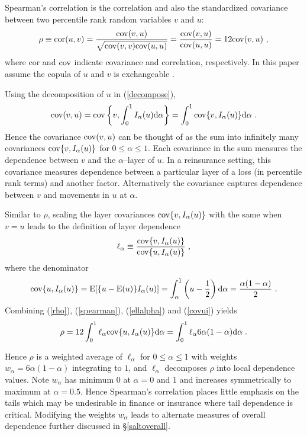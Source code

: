 \documentclass[authoryear]{elsarticle}
\newcommand{\cov}{{\rm cov}}
\newcommand{\E}{{\mathrm E}}
\newcommand{\cor}{\mathrm{cor}}
\newcommand{\de}{\mathrm{d}}
\newcommand{\eref}[1]{(\ref{#1})}
\newcommand{\sref}[1]{\S\ref{#1}}
\begin{document}
Spearman's correlation is the correlation and also the standardized covariance between two percentile rank random variables $v$ and $u$:
\begin{equation}\label{rho}
\rho \equiv \cor(u,v) = \frac{\cov(v,u)}{\sqrt{\cov(v,v)\cov(u,u)}}=\frac{\cov(v,u)}{\cov(u,u)} = 12\cov(v,u)\ ,
\end{equation}
where $\cor$ and $\cov$ indicate covariance and correlation, respectively. In this paper assume the copula of $u$ and $v$ is exchangeable \citep{nelson1999ic}.

Using the decomposition of $u$ in \eref{decompose},
\begin{equation}\label{spearman}
\cov(v,u)=\cov\left\{v,\int_0^1I_\alpha(u)\de \alpha \right\}= \int_0^1 \cov\{v,I_\alpha(u)\} \de \alpha \; .
\end{equation}
Hence the covariance $\cov(v,u)$ can be thought of as the sum  into infinitely many covariances $\cov\{v,I_\alpha(u)\}$ for $0\le\alpha\le 1$. Each covariance in the sum measures the dependence between $v$ and the $\alpha$--layer of $u$. In a reinsurance setting, this covariance measures dependence between a particular layer of a loss (in percentile rank terms) and another factor. Alternatively the covariance captures dependence between $v$ and movements in $u$ at $\alpha$.

 Similar to $\rho$, scaling the layer covariances  $\cov\{v,I_\alpha(u)\}$ with the same when $v=u$ leads to the definition of layer dependence
\begin{equation}\label{ellalpha}
\ell_\alpha \equiv \frac{\cov\{v,I_\alpha(u)\}}{\cov\{u,I_\alpha(u)\}}   \;,
\end{equation}
where the denominator
\begin{equation}\label{covui}
\cov\{u,I_\alpha(u)\}=\E[\{u-\E(u)\}I_\alpha(u)]=\int_\alpha^1 \left(u  - \frac{1}{2}\right)\de \alpha = \frac{\alpha(1-\alpha)}{2}\ .
\end{equation}
Combining \eref{rho}, \eref{spearman}, \eref{ellalpha}  and \eref{covui} yields
\begin{equation}\label{wtdavg}
\rho = 12\int_0^1 \ell_\alpha \cov\{u,I_\alpha(u)\} \de \alpha =  \int_0^1 \ell_\alpha 6\alpha(1-\alpha) \de \alpha \; .
\end{equation}

Hence $\rho$ is a weighted average of $\ell_\alpha$ for $0\le\alpha\le 1$ with weights $w_\alpha=6\alpha(1-\alpha)$ integrating to $1$, and $\ell_\alpha$ decomposes $\rho$ into local dependence values. Note $w_\alpha$ has minimum $0$ at $\alpha=0$ and $1$ and increases symmetrically to maximum at $\alpha=0.5$. Hence Spearman's correlation places little emphasis on the tails which may be undesirable in finance or insurance where tail dependence is critical. Modifying the weights $w_\alpha$ leads to alternate measures of overall dependence further discussed in \sref{saltoverall}.
\end{document}
